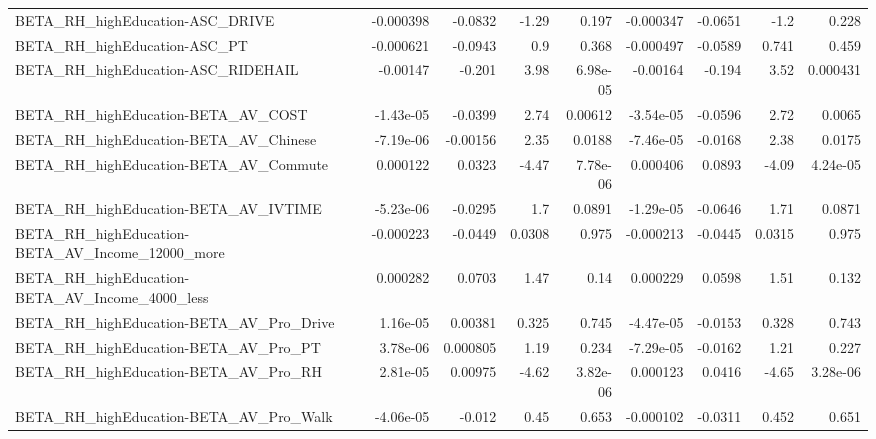 \begin{tabular}{lrrrrrrrr}
BETA\_RH\_highEducation-ASC\_DRIVE                    &   -0.000398 &      -0.0832 &     -1.29 &    0.197 &  -0.000347 &     -0.0651 &         -1.2 &         0.228 \\
BETA\_RH\_highEducation-ASC\_PT                       &   -0.000621 &      -0.0943 &       0.9 &    0.368 &  -0.000497 &     -0.0589 &        0.741 &         0.459 \\
BETA\_RH\_highEducation-ASC\_RIDEHAIL                 &    -0.00147 &       -0.201 &      3.98 & 6.98e-05 &   -0.00164 &      -0.194 &         3.52 &      0.000431 \\
BETA\_RH\_highEducation-BETA\_AV\_COST                 &   -1.43e-05 &      -0.0399 &      2.74 &  0.00612 &  -3.54e-05 &     -0.0596 &         2.72 &        0.0065 \\
BETA\_RH\_highEducation-BETA\_AV\_Chinese              &   -7.19e-06 &     -0.00156 &      2.35 &   0.0188 &  -7.46e-05 &     -0.0168 &         2.38 &        0.0175 \\
BETA\_RH\_highEducation-BETA\_AV\_Commute              &    0.000122 &       0.0323 &     -4.47 & 7.78e-06 &   0.000406 &      0.0893 &        -4.09 &      4.24e-05 \\
BETA\_RH\_highEducation-BETA\_AV\_IVTIME               &   -5.23e-06 &      -0.0295 &       1.7 &   0.0891 &  -1.29e-05 &     -0.0646 &         1.71 &        0.0871 \\
BETA\_RH\_highEducation-BETA\_AV\_Income\_12000\_more    &   -0.000223 &      -0.0449 &    0.0308 &    0.975 &  -0.000213 &     -0.0445 &       0.0315 &         0.975 \\
BETA\_RH\_highEducation-BETA\_AV\_Income\_4000\_less     &    0.000282 &       0.0703 &      1.47 &     0.14 &   0.000229 &      0.0598 &         1.51 &         0.132 \\
BETA\_RH\_highEducation-BETA\_AV\_Pro\_Drive            &    1.16e-05 &      0.00381 &     0.325 &    0.745 &  -4.47e-05 &     -0.0153 &        0.328 &         0.743 \\
BETA\_RH\_highEducation-BETA\_AV\_Pro\_PT               &    3.78e-06 &     0.000805 &      1.19 &    0.234 &  -7.29e-05 &     -0.0162 &         1.21 &         0.227 \\
BETA\_RH\_highEducation-BETA\_AV\_Pro\_RH               &    2.81e-05 &      0.00975 &     -4.62 & 3.82e-06 &   0.000123 &      0.0416 &        -4.65 &      3.28e-06 \\
BETA\_RH\_highEducation-BETA\_AV\_Pro\_Walk             &   -4.06e-05 &       -0.012 &      0.45 &    0.653 &  -0.000102 &     -0.0311 &        0.452 &         0.651 \\

\end{tabular}
